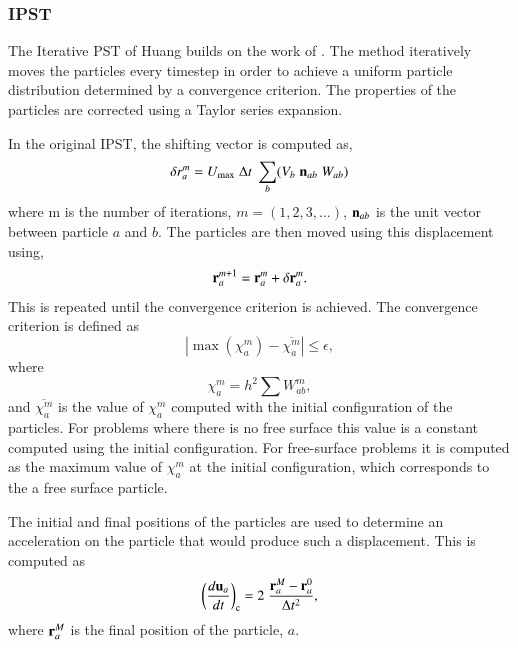 \subsubsection{IPST}
\label{sec:ipst}

The Iterative PST of Huang \citep{huang_kernel_2019} builds on the work of
\cite{xu2009accuracy}. The method iteratively moves the particles every
timestep in order to achieve a uniform particle distribution determined by a
convergence criterion. The properties of the particles are corrected using a
Taylor series expansion.

In the original IPST, the shifting vector is computed as,
\begin{equation}
  \label{eq:ipst_step1}
  \delta r_a^m = U_{\max} \; \Delta t \; \sum_b (V_b \; \mathbf{n}_{ab} \; W_{ab})
\end{equation}
where m is the number of iterations, $m=(1, 2, 3, \dots)$, $\mathbf{n}_{ab}$ is
the unit vector between particle $a$ and $b$. The particles are then moved
using this displacement using,
\begin{equation}
  \label{eq:ipst_step2}
  \mathbf{r}_a^{m+1} = \mathbf{r}_a^{m} + \delta \mathbf{r}_a^{m}.
\end{equation}
This is repeated until the convergence criterion is achieved. The convergence
criterion is defined as
\begin{equation}
  \label{eq:ipst_convergence_criterion}
  |\max(\chi_a^m) - \overline{\chi_a^m}| \leq \epsilon,
\end{equation}
where
\begin{equation}
  \label{eq:ipst_chi_0}
  \chi_a^m = h^2 \sum W^m_{ab},
\end{equation}
%
and $\overline{\chi_a^m}$ is the value of $\chi_a^m$ computed with the initial
configuration of the particles. For problems where there is no free surface
this value is a constant computed using the initial configuration. For
free-surface problems it is computed as the maximum value of $\chi_a^m$ at the
initial configuration, which corresponds to the a free surface particle.

The initial and final positions of the particles are used to determine an
acceleration on the particle that would produce such a displacement.  This is
computed as
\begin{equation}
  \label{eq:ipst_force}
  \bigg(\frac{d \mathbf{u}_a}{dt}\bigg)_{\text{c}} =
  2 \; \frac{\mathbf{r}_a^{M} - \mathbf{r}_a^0}{\Delta t^2},
\end{equation}
where $\mathbf{r}_a^M$ is the final position of the particle, $a$.


